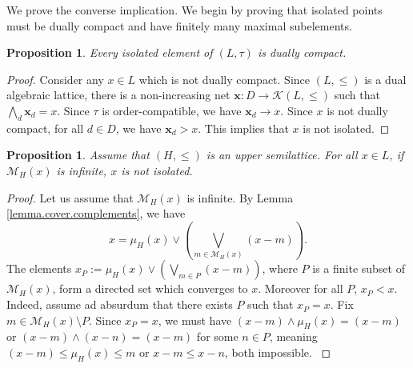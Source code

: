 \documentclass{article}
\newcommand{\blue}{\color{blue}}
\newtheorem{proposition}[theorem]{Proposition}
\begin{document}
{
We prove the converse implication. We begin by proving that isolated points must be dually compact and have finitely many maximal subelements.
}
\begin{proposition}\label{isolated.finite.type}
    Every isolated element of $(L,\tau)$ is 
    {dually compact}. 
\end{proposition}

\begin{proof}
{Consider any $x \in L$ which is not 
{dually compact}. Since $(L,\le)$ is a dual algebraic lattice, there is a non-increasing net $\boldsymbol{x} : D \rightarrow \mathcal{K}(L,\le)$ such that $\bigwedge_d \boldsymbol{x}_d = x$. Since $\tau$ is order-compatible, we have $\boldsymbol{x}_d \rightarrow x$. Since $x$ is not dually compact, for all $d \in D$, we have $\boldsymbol{x}_d > x$. This implies that $x$ is not isolated.}
\end{proof}




\begin{proposition}\label{prop.inf.type}
    Assume that $(H,\le)$ is an upper semilattice. For all $x \in L$, if $\mathcal{M}_H(x)$ is infinite, $x$ is not isolated.  
\end{proposition}

\begin{proof}
   {Let us assume that $\mathcal{M}_H(x)$ is infinite. By Lemma \ref{lemma.cover.complements}, we have 
   \[x = \mu_H(x) \vee \left(\bigvee_{m \in \mathcal{M}_H(x)} (x-m)\right).\]
   The elements $x_P := \mu_H(x) \vee \left(\bigvee_{m \in P} (x-m)\right)$,
    where $P$ is a finite subset of $\mathcal{M}_H(x)$, form a directed set 
    which converges to $x$. Moreover for all $P$, $x_P < x$. Indeed, assume ad absurdum that there exists $P$ such that $x_P = x$. Fix $m \in \mathcal{M}_H(x) \setminus P$. Since $x_P = x$, we must have $(x-m) \wedge \mu_H(x) = (x-m)$ or $(x-m) \wedge (x-n) = (x-m)$ for some $n \in P$, meaning $(x-m) \le \mu_H(x) \le m$ or $x-m \le x-n$, both impossible.
    }
\end{proof}
\end{document}

